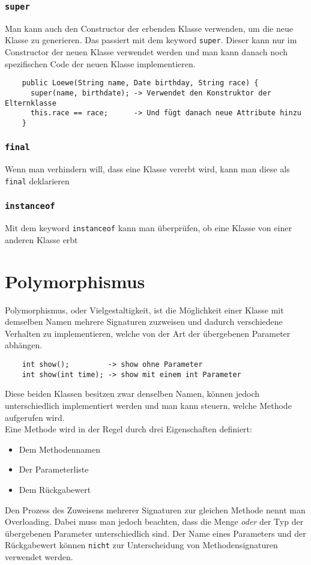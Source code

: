 \documentclass{article}
\begin{document}
	\subsubsection{\texttt{super}}
	Man kann auch den Constructor der erbenden Klasse verwenden, um die neue Klasse zu generieren. Das passiert mit dem keyword \texttt{super}. Dieser kann nur im Constructor der neuen Klasse verwendet werden und man kann danach noch spezifischen Code der neuen Klasse implementieren. \\
	\begin{verbatim}
	public Loewe(String name, Date birthday, String race) {
	  super(name, birthdate); -> Verwendet den Konstruktor der Elternklasse
	  this.race == race;      -> Und fügt danach neue Attribute hinzu
	}
	\end{verbatim}
	\subsubsection{\texttt{final}}
	Wenn man verhindern will, dass eine Klasse vererbt wird, kann man diese als \texttt{final} deklarieren
	\subsubsection{\texttt{instanceof}}
	Mit dem keyword \texttt{instanceof} kann man überprüfen, ob eine Klasse von einer anderen Klasse erbt
	\section{Polymorphismus}
	Polymorphismus, oder Vielgestaltigkeit, ist die Möglichkeit einer Klasse mit demselben Namen mehrere Signaturen zuzweisen und dadurch verschiedene Verhalten zu implementieren, welche von der Art der übergebenen Parameter abhängen.
	\begin{verbatim}
	int show();         -> show ohne Parameter
	int show(int time); -> show mit einem int Parameter
	\end{verbatim}
	Diese beiden Klassen besitzen zwar denselben Namen, können jedoch unterschiedlich implementiert werden und man kann steuern, welche Methode aufgerufen wird. \\
	Eine Methode wird in der Regel durch drei Eigenschaften definiert:
	\begin{itemize}
		\item{Dem Methodennamen}
		\item{Der Parameterliste}
		\item{Dem Rückgabewert}
	\end{itemize}
	Den Prozess des Zuweisens mehrerer Signaturen zur gleichen Methode nennt man Overloading. Dabei muss man jedoch beachten, dass die Menge \textit{oder} der Typ der übergebenen Parameter unterschiedlich sind. Der Name eines Parameters und der Rückgabewert können \texttt{nicht} zur Unterscheidung von Methodensignaturen verwendet werden.
\end{document}
